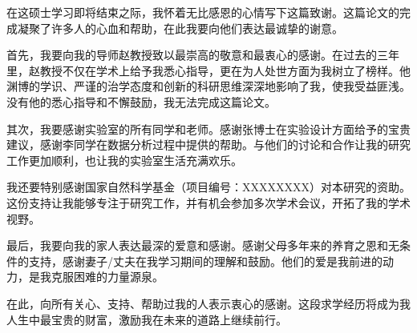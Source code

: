 
\begin{acknowledgments}

在这硕士学习即将结束之际，我怀着无比感恩的心情写下这篇致谢。这篇论文的完成凝聚了许多人的心血和帮助，在此我要向他们表达最诚挚的谢意。

首先，我要向我的导师赵教授致以最崇高的敬意和最衷心的感谢。在过去的三年里，赵教授不仅在学术上给予我悉心指导，更在为人处世方面为我树立了榜样。他渊博的学识、严谨的治学态度和创新的科研思维深深地影响了我，使我受益匪浅。没有他的悉心指导和不懈鼓励，我无法完成这篇论文。

其次，我要感谢实验室的所有同学和老师。感谢张博士在实验设计方面给予的宝贵建议，感谢李同学在数据分析过程中提供的帮助。与他们的讨论和合作让我的研究工作更加顺利，也让我的实验室生活充满欢乐。

我还要特别感谢国家自然科学基金（项目编号：XXXXXXXX）对本研究的资助。这份支持让我能够专注于研究工作，并有机会参加多次学术会议，开拓了我的学术视野。

最后，我要向我的家人表达最深的爱意和感谢。感谢父母多年来的养育之恩和无条件的支持，感谢妻子/丈夫在我学习期间的理解和鼓励。他们的爱是我前进的动力，是我克服困难的力量源泉。

在此，向所有关心、支持、帮助过我的人表示衷心的感谢。这段求学经历将成为我人生中最宝贵的财富，激励我在未来的道路上继续前行。

\end{acknowledgments}
